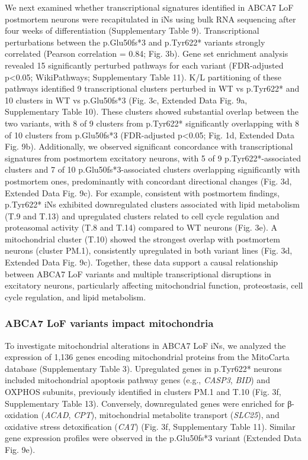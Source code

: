We next examined whether transcriptional signatures identified in ABCA7 LoF postmortem neurons were recapitulated in iNs using bulk RNA sequencing after four weeks of differentiation (Supplementary Table 9). Transcriptional perturbations between the p.Glu50fs*3 and p.Tyr622* variants strongly correlated (Pearson correlation = 0.84; Fig. 3b). Gene set enrichment analysis revealed 15 significantly perturbed pathways for each variant (FDR-adjusted p<0.05; WikiPathways; Supplementary Table 11). K/L partitioning of these pathways identified 9 transcriptional clusters perturbed in WT vs p.Tyr622* and 10 clusters in WT vs p.Glu50fs*3 (Fig. 3c, Extended Data Fig. 9a, Supplementary Table 10). These clusters showed substantial overlap between the two variants, with 8 of 9 clusters from p.Tyr622* significantly overlapping with 8 of 10 clusters from p.Glu50fs*3 (FDR-adjusted p<0.05; Fig. 1d, Extended Data Fig. 9b). Additionally, we observed significant concordance with transcriptional signatures from postmortem excitatory neurons, with 5 of 9 p.Tyr622*-associated clusters and 7 of 10 p.Glu50fs*3-associated clusters overlapping significantly with postmortem ones, predominantly with concordant directional changes (Fig. 3d, Extended Data Fig. 9c). For example, consistent with postmortem findings, p.Tyr622* iNs exhibited downregulated clusters associated with lipid metabolism (T.9 and T.13) and upregulated clusters related to cell cycle regulation and proteasomal activity (T.8 and T.14) compared to WT neurons (Fig. 3e). A mitochondrial cluster (T.10) showed the strongest overlap with postmortem neurons (cluster PM.1), consistently upregulated in both variant lines (Fig. 3d, Extended Data Fig. 9c). Together, these data support a causal relationship between ABCA7 LoF variants and multiple transcriptional disruptions in excitatory neurons, particularly affecting mitochondrial function, proteostasis, cell cycle regulation, and lipid metabolism.

\subsubsection{ABCA7 LoF variants impact mitochondria}
To investigate mitochondrial alterations in ABCA7 LoF iNs, we analyzed the expression of 1,136 genes encoding mitochondrial proteins from the MitoCarta database (Supplementary Table 3). Upregulated genes in p.Tyr622* neurons included mitochondrial apoptosis pathway genes (e.g., \textit{CASP3}, \textit{BID}) and OXPHOS subunits, previously identified in clusters PM.1 and T.10 (Fig. 3f, Supplementary Table 13). Conversely, downregulated genes were enriched for β-oxidation (\textit{ACAD}, \textit{CPT}), mitochondrial metabolite transport (\textit{SLC25}), and oxidative stress detoxification (\textit{CAT}) (Fig. 3f, Supplementary Table 11). Similar gene expression profiles were observed in the p.Glu50fs*3 variant (Extended Data Fig. 9e).

